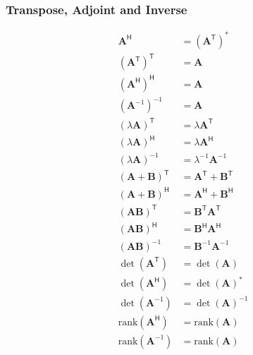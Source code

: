 \subsubsection{Transpose, Adjoint and Inverse}
\noindent\begin{align*}
    \mathbf{A}^\mathsf{H}                  & = {(\mathbf{A}^\mathsf{T})}^*                   \\[.75em]
    {({\mathbf{A}}^\mathsf{T})}^\mathsf{T} & = \mathbf{A}                                    \\
    {({\mathbf{A}}^\mathsf{H})}^\mathsf{H} & = \mathbf{A}                                    \\
    {({\mathbf{A}}^{-1})}^{-1}             & = \mathbf{A}                                    \\[.75em]
    {(\lambda\mathbf{A})}^\mathsf{T}       & = \lambda\mathbf{A}^\mathsf{T}                  \\
    {(\lambda\mathbf{A})}^\mathsf{H}       & = \lambda\mathbf{A}^\mathsf{H}                  \\
    {(\lambda\mathbf{A})}^{-1}             & = \lambda^{-1}\mathbf{A}^{-1}                   \\[.75em]
    {(\mathbf{A}+\mathbf{B})}^\mathsf{T}   & = \mathbf{A}^\mathsf{T} + \mathbf{B}^\mathsf{T} \\
    {(\mathbf{A}+\mathbf{B})}^\mathsf{H}   & = \mathbf{A}^\mathsf{H} + \mathbf{B}^\mathsf{H} \\[.75em]
    {(\mathbf{A}\mathbf{B})}^\mathsf{T}    & = \mathbf{B}^\mathsf{T}\mathbf{A}^\mathsf{T}    \\
    {(\mathbf{A}\mathbf{B})}^\mathsf{H}    & = \mathbf{B}^\mathsf{H}\mathbf{A}^\mathsf{H}    \\
    {(\mathbf{A}\mathbf{B})}^{-1}          & = \mathbf{B}^{-1} \mathbf{A}^{-1}               \\[.75em]
    \det(\mathbf{A}^\mathsf{T})            & = \det(\mathbf{A})                              \\
    \det(\mathbf{A}^\mathsf{H})            & = {\det(\mathbf{A})}^*                          \\
    \det(\mathbf{A}^{-1})                  & = {\det(\mathbf{A})}^{-1}                       \\[.75em]
    \mathrm{rank}{(\mathbf{A}^\mathsf{H})} & = \mathrm{rank}(\mathbf{A})                     \\
    \mathrm{rank}{(\mathbf{A}^{-1} )}      & = \mathrm{rank}(\mathbf{A})
\end{align*}


